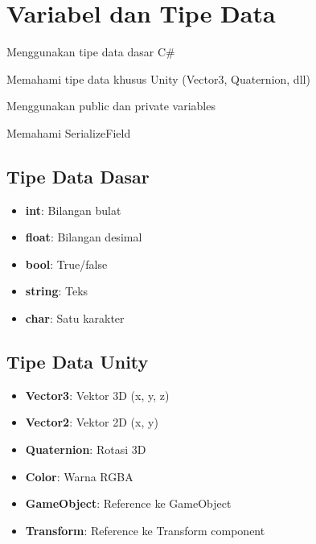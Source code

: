 
\section{Variabel dan Tipe Data}

\begin{learningoutcomes}
\item Menggunakan tipe data dasar C\#
\item Memahami tipe data khusus Unity (Vector3, Quaternion, dll)
\item Menggunakan public dan private variables
\item Memahami SerializeField
\end{learningoutcomes}

\subsection{Tipe Data Dasar}

\begin{itemize}
\item \textbf{int}: Bilangan bulat
\item \textbf{float}: Bilangan desimal
\item \textbf{bool}: True/false
\item \textbf{string}: Teks
\item \textbf{char}: Satu karakter
\end{itemize}

\subsection{Tipe Data Unity}

\begin{itemize}
\item \textbf{Vector3}: Vektor 3D (x, y, z)
\item \textbf{Vector2}: Vektor 2D (x, y)
\item \textbf{Quaternion}: Rotasi 3D
\item \textbf{Color}: Warna RGBA
\item \textbf{GameObject}: Reference ke GameObject
\item \textbf{Transform}: Reference ke Transform component
\end{itemize}

